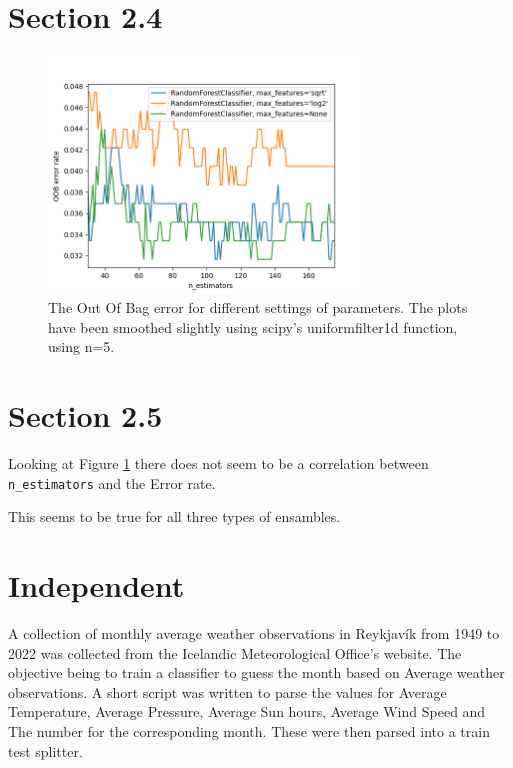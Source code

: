 \documentclass{article}
\begin{document}
\section*{Section 2.4}
\begin{figure}[h]
    \centering
    \includegraphics[width=0.75\textwidth]{09_random_forests/2_4_1.png}
    \caption{The Out Of Bag error for different settings of parameters. The plots have been smoothed slightly using scipy's uniformfilter1d function, using n=5.}
    \label{fig:24}
\end{figure}

\section*{Section 2.5}
Looking at Figure \ref{fig:24} there does not seem to be a correlation between \verb"n_estimators" and the Error rate.

This seems to be true for all three types of ensambles.



\section*{Independent}
A collection of monthly average weather observations in Reykjavík from 1949 to 2022 was collected from the Icelandic Meteorological Office's website. The objective being to train a classifier to guess the month based on Average weather observations. A short script was written to parse the values for Average Temperature, Average Pressure, Average Sun hours, Average Wind Speed and The number for the corresponding month. These were then parsed into a train test splitter. 
\end{document}
